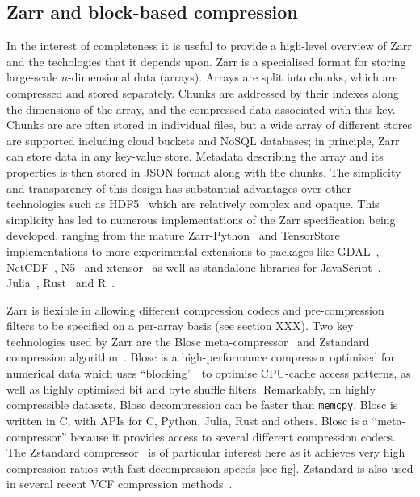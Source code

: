 \documentclass[a4paper,num-refs]{oup-contemporary}
\begin{document}
\subsection{Zarr and block-based compression}
In the interest of completeness it is useful to provide a high-level overview
of Zarr and the techologies that it depends upon. Zarr is a specialised format
for storing large-scale $n$-dimensional data (arrays). Arrays
are split into chunks, which are compressed and stored separately. Chunks are 
addressed by their indexes along the dimensions of the array, and the 
compressed data associated with this key. Chunks are
are often stored in individual files, but a wide array of different
stores are supported including cloud buckets and NoSQL databases;
in principle, Zarr can store data in any key-value store.
Metadata describing the array and its properties is then stored 
in JSON format along with the chunks. The simplicity and transparency
of this design has substantial advantages over other technologies
such as HDF5~\citep{folk2011overview} which are relatively complex and opaque.
This simplicity has led to numerous implementations of the Zarr specification
being developed, ranging from the mature Zarr-Python~\citep{zarrpython}
and TensorStore~\citep{tensorstore} implementations
to more experimental extensions to packages like
GDAL~\citep{gdal_zarr},
NetCDF~\citep{netcfd_c},
N5~\citep{n5zarr}
and xtensor~\citep{xtensor_zarr}
as well as  standalone libraries for JavaScript~\cite{zarrjs},
Julia~\cite{zarrjl}, Rust~\citep{zarrs}
and R~\cite{pizzarr}.

Zarr is flexible in allowing different compression codecs and 
pre-compression filters to be specified on a per-array basis
(see section XXX).
Two key technologies used by Zarr are the Blosc
meta-compressor~\cite{alted2010modern}
and Zstandard compression algorithm~\citep{collet2021rfc}.
Blosc is a high-performance compressor optimised for numerical
data which uses ``blocking''~\citep{alted2010modern} to 
optimise CPU-cache access patterns, as well as highly optimised
bit and byte shuffle filters.  Remarkably, on highly 
compressible datasets, Blosc decompression can be faster 
than \texttt{memcpy}.
Blosc is written in C, with APIs for C, Python, Julia, Rust
and others.
Blosc is a ``meta-compressor'' because it provides 
access to several different compression codecs. The 
Zstandard compressor~\citep{collet2021rfc} is of particular 
interest here as it achieves very high compression ratios
with fast decompression speeds [see fig]. 
Zstandard is also used in several recent VCF compression 
methods~\citep[e.g.][]{lefaive2021sparse,wertenbroek2022xsi}.
\end{document}
